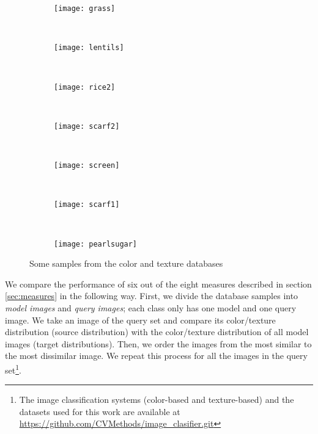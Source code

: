 \begin{figure}[!ht]
        
    \begin{subfigure}[b]{0.1\textwidth}
		\centering
		\texttt{[image: grass]}	
	\end{subfigure}
	~ %
    \begin{subfigure}[b]{0.1\textwidth}
		\centering
		\texttt{[image: lentils]}	
	\end{subfigure}
    ~ %
    \begin{subfigure}[b]{0.1\textwidth}
		\centering
		\texttt{[image: rice2]}	
	\end{subfigure}
	~ %
    \begin{subfigure}[b]{0.1\textwidth}
		\centering
		\texttt{[image: scarf2]}	
	\end{subfigure}
    ~ %
    \begin{subfigure}[b]{0.1\textwidth}
		\centering
		\texttt{[image: screen]}	
	\end{subfigure}
    ~ %
    \begin{subfigure}[b]{0.1\textwidth}
		\centering
		\texttt{[image: scarf1]}	
	\end{subfigure}
    ~ %
    \begin{subfigure}[b]{0.1\textwidth}
		\centering
		\texttt{[image: pearlsugar]}	
	\end{subfigure}
		
    \caption{Some samples from the color and texture databases}
    \label{fig:databases}
\end{figure}

We compare the performance of six out of the eight measures described in section \ref{sec:measures} in the following way. First, we divide the database samples into \textit{model images} and \textit{query images}; each class only has one model and one query image. We take an image of the query set and compare its color/texture distribution (source distribution) with the color/texture distribution of all model images (target distributions). Then, we order the images from the most similar to the most dissimilar image. We repeat this process for all the images in the query set\footnote{The image classification systems (color-based and texture-based) and the datasets used for this work are available at \url{https://github.com/CVMethods/image_clasifier.git}}.
 
